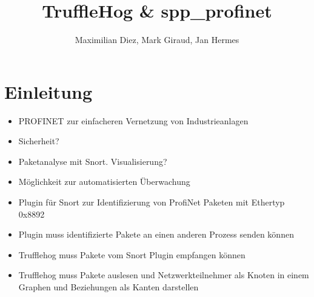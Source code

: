\documentclass[18pt]{beamer}
\title[TruffleHog \& spp\_profinet]{TruffleHog \& spp\_profinet}
\author{Maximilian Diez, Mark Giraud, Jan Hermes}
\institute{Fraunhofer IOSB}
\begin{document}

\begin{frame}
\titlepage
\end{frame}


\section{Einleitung}

\begin{frame}
    \begin{itemize}
      \item PROFINET zur einfacheren Vernetzung von Industrieanlagen
      \pause
      \item Sicherheit?
      \pause
      \item Paketanalyse mit Snort. Visualisierung?
      \pause
      \item Möglichkeit zur automatisierten Überwachung
    \end{itemize}
\end{frame}


\begin{frame}
    \begin{itemize}
      \item Plugin für Snort zur Identifizierung von ProfiNet Paketen mit Ethertyp 0x8892
      \item Plugin muss identifizierte Pakete an einen anderen Prozess senden können
    \end{itemize}
\end{frame}


\begin{frame}
    \begin{itemize}
      \item Trufflehog muss Pakete vom Snort Plugin empfangen können
      \item Trufflehog muss Pakete auslesen und Netzwerkteilnehmer als Knoten in einem Graphen
   und Beziehungen als Kanten darstellen
    \end{itemize}
\end{frame}
\end{document}

